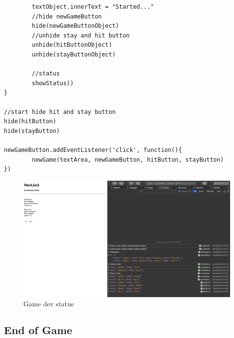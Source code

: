 \documentclass[10pt, a4paper, twocolumn]{article}
\begin{document}
\begin{lstlisting}
		textObject.innerText = "Started..."
		//hide newGameButton
		hide(newGameButtonObject)
		//unhide stay and hit button
		unhide(hitButtonObject)
		unhide(stayButtonObject)

		//status
		showStatus()
}

//start hide hit and stay button
hide(hitButton)
hide(stayButton)

newGameButton.addEventListener('click', function(){
		newGame(textArea, newGameButton, hitButton, stayButton)
})
\end{lstlisting}

\begin{figure}[h!]
	\includegraphics[width=\linewidth]{imgs/dev1.PNG}
	\caption{Game dev status}
	\label{gm}
\end{figure}

\subsection{End of Game}
\end{document}
